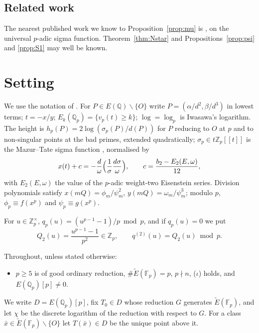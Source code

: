 \documentclass[11pt,a4paper]{amsart}
\newcommand{\Q}{\mathbb{Q}}
\newcommand{\Qp}{\mathbb{Q}_p}
\newcommand{\Zp}{\mathbb{Z}_p}
\newcommand{\Fp}{\mathbb{F}_p}
\newcommand{\Et}{\widetilde{E}}
\newcommand{\qp}{q_p}
\theoremstyle{plain}
\theoremstyle{definition}
\theoremstyle{remark}
\begin{document}
\subsection*{Related work}
The nearest published work we know to Proposition~\ref{prop:mu} is \cite{BG}, on the universal $p$-adic sigma function. Theorem~\ref{thm:Nstar} and Propositions~\ref{prop:psi} and \ref{prop:S1} may well be known.

\section{Setting}\label{sec:setting}

We use the notation of \cite{P1}. For $P\in E(\Q)\smallsetminus\{O\}$ write $P=(\alpha/d^2,\beta/d^3)$ in lowest terms; $t=-x/y$; $E_k(\Qp)=\{v_p(t)\ge k\}$; $\log=\log_p$ is Iwasawa's logarithm. The height is $h_p(P)=2\log(\sigma_p(P)/d(P))$ for $P$ reducing to $O$ at $p$ and to non-singular points at the bad primes, extended quadratically; $\sigma_p\in t\Zp[[t]]$ is the Mazur--Tate sigma function \cite{MT91}, normalised by
\[
x(t)+c=-\frac{d}{\omega}\Bigl(\frac1\sigma\frac{d\sigma}{\omega}\Bigr),\qquad c=\frac{b_2-E_2(E,\omega)}{12},
\]
with $E_2(E,\omega)$ the value of the $p$-adic weight-two Eisenstein series. Division polynomials satisfy $x(mQ)=\phi_m/\psi_m^2$, $y(mQ)=\omega_m/\psi_m^3$; modulo $p$, $\phi_p\equiv f(x^p)$ and $\psi_p\equiv g(x^p)$.

For $u\in\Zp^\times$, $\qp(u)=(u^{p-1}-1)/p\bmod p$, and if $\qp(u)=0$ we put
\[
Q_2(u)=\frac{u^{p-1}-1}{p^2}\in\Zp,\qquad q^{(2)}(u)=Q_2(u)\bmod p .
\]

Throughout, unless stated otherwise:
\begin{itemize}
\item[(H)] $p\ge5$ is of good ordinary reduction, $\#\Et(\Fp)=p$, $p\nmid n$, ($\iota$) holds, and $E(\Qp)[p]\ne0$.
\end{itemize}
We write $D=E(\Qp)[p]$, fix $T_0\in D$ whose reduction $G$ generates $\Et(\Fp)$, and let $\chi$ be the discrete logarithm of the reduction with respect to $G$. For a class $\bar x\in\Et(\Fp)\smallsetminus\{O\}$ let $T(\bar x)\in D$ be the unique point above it.
\end{document}
